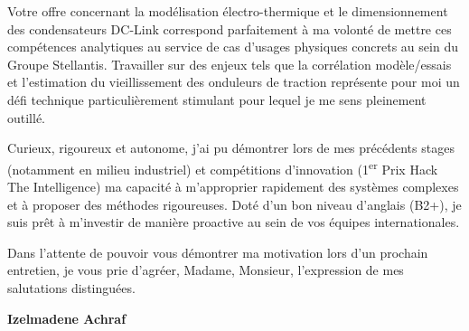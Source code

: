 \documentclass[10pt,a4paper]{altacv}
\begin{document}
\vspace{0.4cm}

Votre offre concernant la modélisation électro-thermique et le dimensionnement des condensateurs DC-Link correspond parfaitement à ma volonté de mettre ces compétences analytiques au service de cas d'usages physiques concrets au sein du Groupe Stellantis. Travailler sur des enjeux tels que la corrélation modèle/essais et l'estimation du vieillissement des onduleurs de traction représente pour moi un défi technique particulièrement stimulant pour lequel je me sens pleinement outillé.

\vspace{0.4cm}

Curieux, rigoureux et autonome, j'ai pu démontrer lors de mes précédents stages (notamment en milieu industriel) et compétitions d'innovation (1\textsuperscript{er} Prix Hack The Intelligence) ma capacité à m'approprier rapidement des systèmes complexes et à proposer des méthodes rigoureuses. Doté d'un bon niveau d'anglais (B2+), je suis prêt à m'investir de manière proactive au sein de vos équipes internationales.

\vspace{0.4cm}

Dans l'attente de pouvoir vous démontrer ma motivation lors d'un prochain entretien, je vous prie d'agréer, Madame, Monsieur, l'expression de mes salutations distinguées.

\vspace{0.5cm}

\vfill

\begin{flushright}
  \Large\color{emphasis}\textbf{Izelmadene Achraf}
\end{flushright}
\end{document}
